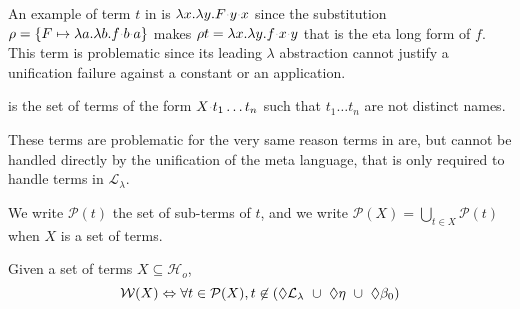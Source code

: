 \documentclass[sigconf,natbib=false,review]{acmart}
\newcommand{\appsep}{\ensuremath{\textcolor{lightgray}{\cdot}}}
\newcommand{\llambda}{\ensuremath{\mathcal{L}_\lambda}\xspace}
\newcommand{\Ho}{\ensuremath{\mathcal{H}_o}\xspace}
\begin{document}
\noindent
An example of term $t$ in \maybeeta{} is
$\lambda x.\lambda y.F \appsep y \appsep x$
since the substitution
$\rho = \{ F \mapsto \lambda a.\lambda b.f \appsep b \appsep a\}$
makes $\rho t = \lambda x.\lambda y.f \appsep x \appsep y$
that is the eta long form of $f$. This term is problematic since
its leading $\lambda$ abstraction cannot justify a
unification failure against a constant or an application.

\begin{definition}[\notllambda]\label{def:notllambda}
  \notllambda is the set of terms of the form $X \appsep t_1 \ldots t_n$
  such that $t_1 \ldots t_n$ are not distinct names.
\end{definition}

\noindent
These terms are problematic for the very same reason terms in \maybebeta are,
but cannot be handled directly by the unification of the meta language, that
is only required to handle terms in \llambda.


\newcommand{\subterm}[1]{\ensuremath{\mathcal{P}(#1)}}
We write $\subterm{t}$ the set of sub-terms of $t$, and
we write $\subterm{X} = \bigcup_{t\in X} \subterm{t}$ when $X$ is a set of terms.

\newcommand{\wellb}{\ensuremath{\mathcal{W}}\xspace}
\begin{definition}
Given a set of terms $X \subseteq \Ho{}$,
$$
\wellb(X) \Leftrightarrow \forall t \in \subterm{X}, t \not\in (\notllambda{} ~\cup~ \maybeeta{} ~\cup~ \maybebeta{})
$$
\end{definition}
\end{document}
